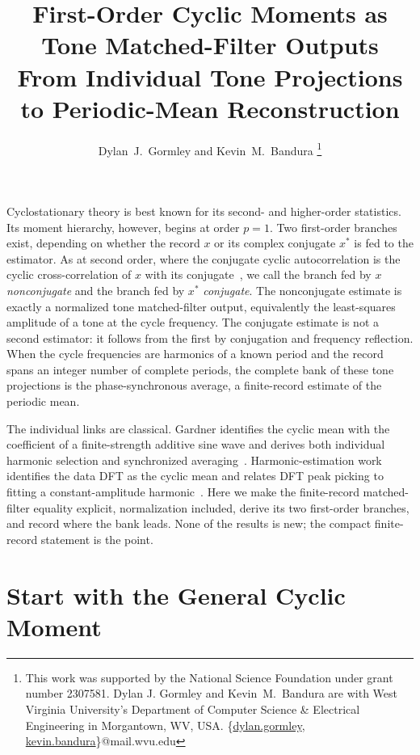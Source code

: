 \documentclass[11pt,draftcls,onecolumn,journal]{IEEEtran}
\title{First-Order Cyclic Moments as Tone Matched-Filter Outputs\\
{\large From Individual Tone Projections to Periodic-Mean Reconstruction}}
\author{Dylan~J.~Gormley and Kevin~M.~Bandura%
\thanks{This work was supported by the National Science Foundation under grant number 2307581.
Dylan J. Gormley and Kevin~M.~Bandura are with West Virginia University's Department of Computer Science \& Electrical Engineering in Morgantown, WV, USA.  %
\{\href{mailto:dylan.gormley@mail.wvu.edu}{dylan.gormley}, \href{mailto:kevin.bandura@mail.wvu.edu}{kevin.bandura}\}@mail.wvu.edu
}%
}
\begin{document}
\maketitle
\noindent Cyclostationary theory is best known for its second- and higher-order statistics.  Its moment hierarchy, however, begins at order $p=1$.  Two first-order branches exist, depending on whether the record $x$ or its complex conjugate $x^*$ is fed to the estimator.  As at second order, where the conjugate cyclic autocorrelation is the cyclic cross-correlation of $x$ with its conjugate~\cite[Sec. 2.4]{gardner1986}, we call the branch fed by $x$ \emph{nonconjugate} and the branch fed by $x^*$ \emph{conjugate}.  The nonconjugate estimate is exactly a normalized tone matched-filter output, equivalently the least-squares amplitude of a tone at the cycle frequency.  The conjugate estimate is not a second estimator: it follows from the first by conjugation and frequency reflection.  When the cycle frequencies are harmonics of a known period and the record spans an integer number of complete periods, the complete bank of these tone projections is the phase-synchronous average, a finite-record estimate of the periodic mean.

The individual links are classical.  Gardner identifies the cyclic mean with the coefficient of a finite-strength additive sine wave and derives both individual harmonic selection and synchronized averaging~\cite[eqs. (17)--(23)]{gardner1986}.  Harmonic-estimation work identifies the data DFT as the cyclic mean and relates DFT peak picking to fitting a constant-amplitude harmonic~\cite[Sec. 1]{ghogho1999}.  Here we make the finite-record matched-filter equality explicit, normalization included, derive its two first-order branches, and record where the bank leads.  None of the results is new; the compact finite-record statement is the point.

\section*{Start with the General Cyclic Moment}
\end{document}
